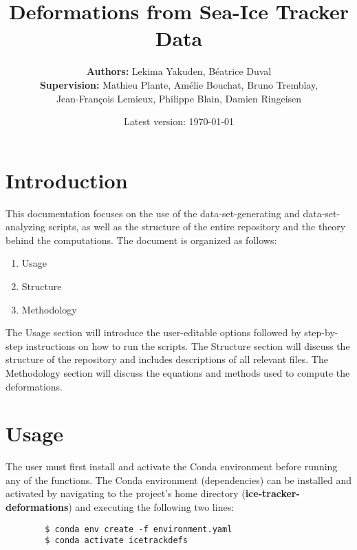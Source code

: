 \documentclass{article}
\begin{document}
\title{Deformations from Sea-Ice Tracker Data}

\author{\textbf{Authors:} Lekima Yakuden, Béatrice Duval \\[0.5cm] \textbf{Supervision:} Mathieu Plante, Amélie Bouchat, Bruno Tremblay,\\ Jean-François Lemieux, Philippe Blain, Damien Ringeisen}

\date{Latest version: \today}

\maketitle

\tableofcontents

\newpage

\section{Introduction}

    This documentation focuses on the use of the data-set-generating and data-set-analyzing scripts, as well as the structure of the entire repository and the theory behind the computations. The document is organized as follows:
    \begin{enumerate}
        \item Usage
        \item Structure
        \item Methodology
    \end{enumerate}
    The Usage section will introduce the user-editable options followed by step-by-step instructions on how to run the scripts. The Structure section will discuss the structure of the repository and includes descriptions of all relevant files. The Methodology section will discuss the equations and methods used to compute the deformations.

\section{Usage}
\label{Usage}

    The user must first install and activate the Conda environment before running any of the functions. The Conda environment (dependencies) can be installed and activated by navigating to the project's home directory (\textbf{ice-tracker-deformations}) and executing the following two lines:
    \begin{verbatim}
        $ conda env create -f environment.yaml
        $ conda activate icetrackdefs
    \end{verbatim}
\end{document}
